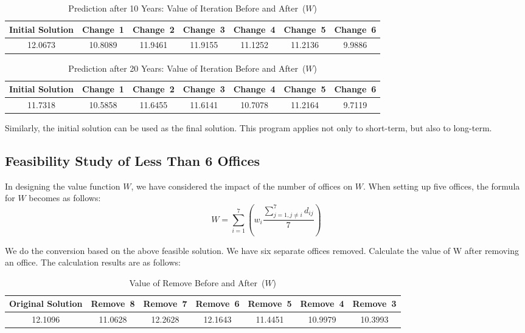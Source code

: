 \documentclass{mcmthesis}
\begin{document}
    \begin{table}[h]
      \centering
      \caption{Prediction after 10 Years: Value of Iteration Before and After\ ($W$)}

      \begin{tabular}{ccccccc}
        \toprule%
        Initial Solution&Change\ 1&Change\ 2&Change\ 3&Change\ 4&Change\ 5&Change\ 6\\
        \midrule%
          12.0673&10.8089&11.9461&11.9155&11.1252&11.2136&9.9886\\
        \bottomrule%
      \end{tabular}
    \end{table}

    \begin{table}[h]
      \centering
      \caption{Prediction after 20 Years: Value of Iteration Before and After\ ($W$)}

      \begin{tabular}{ccccccc}
        \toprule%
        Initial Solution&Change\ 1&Change\ 2&Change\ 3&Change\ 4&Change\ 5&Change\ 6\\
        \midrule%
          11.7318&10.5858&11.6455&11.6141&10.7078&11.2164&9.7119\\
        \bottomrule%
      \end{tabular}
    \end{table}

    Similarly, the initial solution can be used as the final solution.
    This program applies not only to short-term, but also to long-term.

    \subsection{Feasibility Study of Less Than 6 Offices}%
    In designing the value function $W$, we have considered the impact of the number of offices on $W$.
    When setting up five offices, the formula for $W$ becomes as follows:
    $$W=\sum_{i=1}^7(w_i\frac{\sum_{j=1,j\neq i}^7 d_{ij}}{7})$$

    We do the conversion based on the above feasible solution.
    We have six separate offices removed. Calculate the value of W after removing an office.
    The calculation results are as follows:

    \begin{table}[h]
      \centering
      \caption{Value of Remove Before and After\ ($W$)}

      \begin{tabular}{ccccccc}
        \toprule%
        Original Solution&Remove\ 8&Remove\ 7&Remove\ 6&Remove\ 5&Remove\ 4&Remove\ 3\\
        \midrule%
          12.1096&11.0628&12.2628&12.1643&11.4451&10.9979&10.3993\\
        \bottomrule%
      \end{tabular}
    \end{table}
\end{document}

